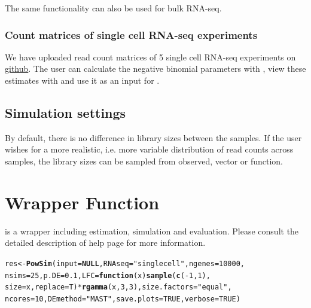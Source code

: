 \documentclass{article}\usepackage[]{graphicx}\usepackage[usenames,dvipsnames]{color}
\makeatletter
\newcommand{\hlnum}[1]{\textcolor[rgb]{0.686,0.059,0.569}{#1}}%
\newcommand{\hlstr}[1]{\textcolor[rgb]{0.192,0.494,0.8}{#1}}%
\newcommand{\hlopt}[1]{\textcolor[rgb]{0,0,0}{#1}}%
\newcommand{\hlstd}[1]{\textcolor[rgb]{0.345,0.345,0.345}{#1}}%
\newcommand{\hlkwa}[1]{\textcolor[rgb]{0.161,0.373,0.58}{\textbf{#1}}}%
\newcommand{\hlkwb}[1]{\textcolor[rgb]{0.69,0.353,0.396}{#1}}%
\newcommand{\hlkwc}[1]{\textcolor[rgb]{0.333,0.667,0.333}{#1}}%
\newcommand{\hlkwd}[1]{\textcolor[rgb]{0.737,0.353,0.396}{\textbf{#1}}}%
\newenvironment{kframe}{%
 \def\at@end@of@kframe{}%
 \ifinner\ifhmode%
  \def\at@end@of@kframe{\end{minipage}}%
  \begin{minipage}{\columnwidth}%
 \fi\fi%
 \def\FrameCommand##1{\hskip\@totalleftmargin \hskip-\fboxsep
 \colorbox{shadecolor}{##1}\hskip-\fboxsep
     \hskip-\linewidth \hskip-\@totalleftmargin \hskip\columnwidth}%
 \MakeFramed {\advance\hsize-\width
   \@totalleftmargin\z@ \linewidth\hsize
   \@setminipage}}%
 {\par\unskip\endMakeFramed%
 \at@end@of@kframe}
\newenvironment{knitrout}{}{} %
\makeatother
\begin{document}
The same functionality can also be used for bulk RNA-seq.

\subsubsection{Count matrices of single cell RNA-seq experiments}

We have uploaded read count matrices of 5 single cell RNA-seq experiments on \href{https://github.com/bvieth/powsimRData}{github}.
The user can calculate the negative binomial parameters with , view these estimates with  and use it as an input for .


\subsection{Simulation settings}

By default, there is no difference in library sizes between the samples. If the user wishes for a more realistic, i.e. more variable distribution of read counts across samples, the library sizes can be sampled from observed, vector or function.

\section{Wrapper Function}

 is a wrapper including estimation, simulation and evaluation. Please consult the detailed description of  help page for more information.
\begin{knitrout}
\color{fgcolor}\begin{kframe}
\begin{alltt}
\hlstd{res} \hlkwb{<-} \hlkwd{PowSim}\hlstd{(}\hlkwc{input} \hlstd{=} \hlkwa{NULL}\hlstd{,} \hlkwc{RNAseq} \hlstd{=} \hlstr{"singlecell"}\hlstd{,} \hlkwc{ngenes} \hlstd{=} \hlnum{10000}\hlstd{,}
    \hlkwc{nsims} \hlstd{=} \hlnum{25}\hlstd{,} \hlkwc{p.DE} \hlstd{=} \hlnum{0.1}\hlstd{,} \hlkwc{LFC} \hlstd{=} \hlkwa{function}\hlstd{(}\hlkwc{x}\hlstd{)} \hlkwd{sample}\hlstd{(}\hlkwd{c}\hlstd{(}\hlopt{-}\hlnum{1}\hlstd{,} \hlnum{1}\hlstd{),}
        \hlkwc{size} \hlstd{= x,} \hlkwc{replace} \hlstd{= T)} \hlopt{*} \hlkwd{rgamma}\hlstd{(x,} \hlnum{3}\hlstd{,} \hlnum{3}\hlstd{),} \hlkwc{size.factors} \hlstd{=} \hlstr{"equal"}\hlstd{,}
    \hlkwc{ncores} \hlstd{=} \hlnum{10}\hlstd{,} \hlkwc{DEmethod} \hlstd{=} \hlstr{"MAST"}\hlstd{,} \hlkwc{save.plots} \hlstd{=} \hlnum{TRUE}\hlstd{,} \hlkwc{verbose} \hlstd{=} \hlnum{TRUE}\hlstd{)}
\end{alltt}
\end{kframe}
\end{knitrout}
\end{document}
